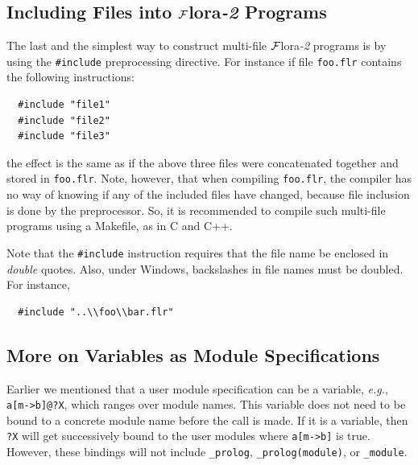 \documentclass[11pt]{article}
\newcommand{\FLORA}{{\mbox{\sc ${\cal F}${lora}\rm\emph{-2}}}\xspace}
\begin{document}
\subsection{Including Files into \FLORA Programs}

The last and the simplest way to construct multi-file \FLORA 
programs is by using the {\tt \#include} preprocessing directive.
For instance if file {\tt foo.flr} contains the following instructions:
\begin{verbatim}
  #include "file1" 
  #include "file2"
  #include "file3"
\end{verbatim}
the effect is the same as if the above three files were concatenated
together and stored in {\tt foo.flr}.
Note, however, that when compiling {\tt foo.flr}, the compiler has no way
of knowing if any of the included files have changed, because file
inclusion is done by the preprocessor. So, it is recommended to compile
such multi-file programs using a Makefile, as in C and C++.

Note that the {\tt \#include} instruction requires that the file name be
enclosed in \emph{double} quotes.
Also, under Windows, backslashes in file names must be doubled. For
instance, 
\begin{verbatim}
  #include "..\\foo\\bar.flr"  
\end{verbatim}

\subsection{More on Variables as Module Specifications}

Earlier we mentioned that a user module specification can be a variable,
{\it e.g.}, {\tt a[m->b]@?X}, which ranges over module names. This variable
does not need to be bound to a concrete module name before the call is
made.  If it is a variable, then {\tt ?X} will get successively bound to the
user modules where {\tt a[m->b]} is true.  However, these bindings will not
include {\tt \_prolog}, {\tt \_prolog(module)}, or {\tt \_module}.
\end{document}
